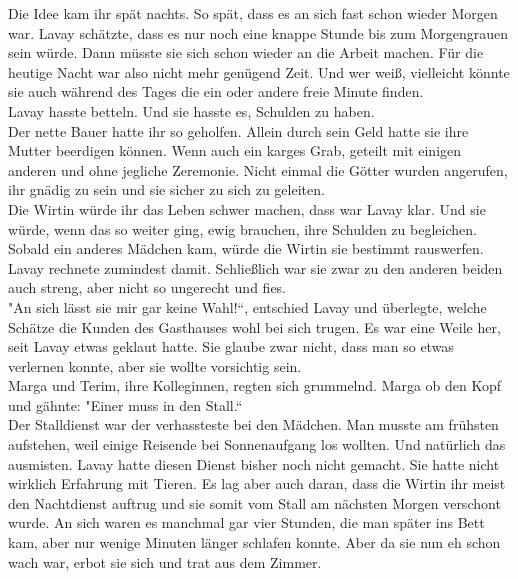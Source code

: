 Die Idee kam ihr spät nachts. So spät, dass es an sich fast schon wieder Morgen war. Lavay 
schätzte, dass es nur noch eine knappe Stunde bis zum Morgengrauen sein würde. Dann müsste sie sich 
schon wieder an die Arbeit machen. Für die heutige Nacht war also nicht mehr genügend Zeit. Und wer 
weiß, vielleicht könnte sie auch während des Tages die ein oder andere freie Minute finden.\\
Lavay hasste betteln. Und sie hasste es, Schulden zu haben.\\
Der nette Bauer hatte ihr so geholfen. Allein durch sein Geld hatte sie ihre Mutter beerdigen 
können. Wenn auch ein karges Grab, geteilt mit einigen anderen und ohne jegliche Zeremonie. Nicht 
einmal die Götter wurden angerufen, ihr gnädig zu sein und sie sicher zu sich zu geleiten.\\
Die Wirtin würde ihr das Leben schwer machen, dass war Lavay klar. Und sie würde, wenn das so 
weiter ging, ewig brauchen, ihre Schulden zu begleichen. Sobald ein anderes Mädchen kam, würde die 
Wirtin sie bestimmt rauswerfen. Lavay rechnete zumindest damit. Schließlich war sie zwar zu den 
anderen beiden auch streng, aber nicht so ungerecht und fies.\\
"An sich lässt sie mir gar keine Wahl!``, entschied Lavay und überlegte, welche Schätze die Kunden 
des Gasthauses wohl bei sich trugen. Es war eine Weile her, seit Lavay etwas geklaut hatte. Sie 
glaube zwar nicht, dass man so etwas verlernen konnte, aber sie wollte vorsichtig sein.\\ 
Marga und Terim, ihre Kolleginnen, regten sich grummelnd. Marga ob den Kopf und gähnte: "Einer muss 
in den Stall.``\\
Der Stalldienst war der verhassteste bei den Mädchen. Man musste am frühsten aufstehen, weil 
einige Reisende bei Sonnenaufgang los wollten. Und natürlich das ausmisten. Lavay hatte diesen 
Dienst bisher noch nicht gemacht. Sie hatte nicht wirklich Erfahrung mit Tieren. Es lag aber auch 
daran, dass die Wirtin ihr meist den Nachtdienst auftrug und sie somit vom Stall am nächsten Morgen 
verschont wurde. An sich waren es manchmal gar vier Stunden, die man später ins Bett kam, aber nur 
wenige Minuten länger schlafen konnte. Aber da sie nun eh schon wach war, erbot sie sich und trat 
aus dem Zimmer.\\


